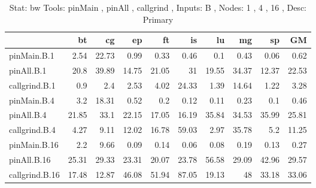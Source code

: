 \begin{table}[]
\caption{Stat: bw 
 Tools: pinMain , pinAll , callgrind ,  
 Inputs: B ,  
 Nodes: 1 , 4 , 16 ,  
 Desc: Primary}
\begin{center}
\begin{tabular}{|l|rrrrrrrr|r|}
\hline
                &    bt &    cg &    ep &    ft &    is &    lu &    mg &    sp &    GM \\
\hline
 pinMain.B.1    &  2.54 & 22.73 &  0.99 &  0.33 &  0.46 &   0.1 &  0.43 &  0.06 &  0.62 \\
 pinAll.B.1     &  20.8 & 39.89 & 14.75 & 21.05 &    31 & 19.55 & 34.37 & 12.37 & 22.53 \\
 callgrind.B.1  &   0.9 &   2.4 &  2.53 &  4.02 & 24.33 &  1.39 & 14.64 &  1.22 &  3.28 \\
\hline
 pinMain.B.4    &   3.2 & 18.31 &  0.52 &   0.2 &  0.12 &  0.11 &  0.23 &   0.1 &  0.46 \\
 pinAll.B.4     & 21.85 &  33.1 & 22.15 & 17.05 & 16.19 & 35.84 & 34.53 & 35.99 & 25.81 \\
 callgrind.B.4  &  4.27 &  9.11 & 12.02 & 16.78 & 59.03 &  2.97 & 35.78 &   5.2 & 11.25 \\
 \hline
 pinMain.B.16   &   2.2 &  9.66 &  0.09 &  0.14 &  0.06 &  0.08 &  0.19 &  0.13 &  0.27 \\
 pinAll.B.16    & 25.31 & 29.33 & 23.31 & 20.07 & 23.78 & 56.58 & 29.09 & 42.96 & 29.57 \\
 callgrind.B.16 & 17.48 & 12.87 & 46.08 & 51.94 & 87.05 & 19.13 &    48 & 33.18 & 33.06 \\

\hline
\end{tabular}
\end{center}
\end{table}
